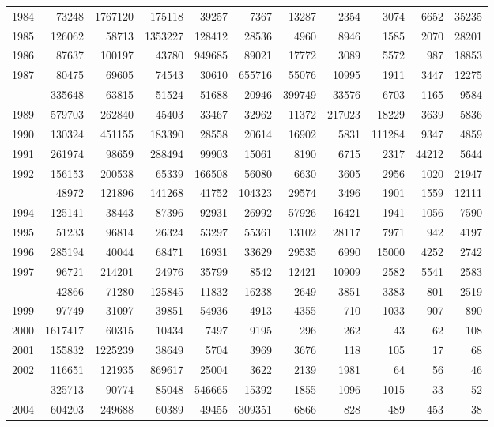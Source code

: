 \documentclass[
]{article}
\begin{document}
\begin{longtable}[t]{lrrrrrrrrrr}
1984 & 73248 & 1767120 & 175118 & 39257 & 7367 & 13287 & 2354 & 3074 & 6652 & 35235\\
1985 & 126062 & 58713 & 1353227 & 128412 & 28536 & 4960 & 8946 & 1585 & 2070 & 28201\\
1986 & 87637 & 100197 & 43780 & 949685 & 89021 & 17772 & 3089 & 5572 & 987 & 18853\\
1987 & 80475 & 69605 & 74543 & 30610 & 655716 & 55076 & 10995 & 1911 & 3447 & 12275\\
\addlinespace
1988 & 335648 & 63815 & 51524 & 51688 & 20946 & 399749 & 33576 & 6703 & 1165 & 9584\\
1989 & 579703 & 262840 & 45403 & 33467 & 32962 & 11372 & 217023 & 18229 & 3639 & 5836\\
1990 & 130324 & 451155 & 183390 & 28558 & 20614 & 16902 & 5831 & 111284 & 9347 & 4859\\
1991 & 261974 & 98659 & 288494 & 99903 & 15061 & 8190 & 6715 & 2317 & 44212 & 5644\\
1992 & 156153 & 200538 & 65339 & 166508 & 56080 & 6630 & 3605 & 2956 & 1020 & 21947\\
\addlinespace
1993 & 48972 & 121896 & 141268 & 41752 & 104323 & 29574 & 3496 & 1901 & 1559 & 12111\\
1994 & 125141 & 38443 & 87396 & 92931 & 26992 & 57926 & 16421 & 1941 & 1056 & 7590\\
1995 & 51233 & 96814 & 26324 & 53297 & 55361 & 13102 & 28117 & 7971 & 942 & 4197\\
1996 & 285194 & 40044 & 68471 & 16931 & 33629 & 29535 & 6990 & 15000 & 4252 & 2742\\
1997 & 96721 & 214201 & 24976 & 35799 & 8542 & 12421 & 10909 & 2582 & 5541 & 2583\\
\addlinespace
1998 & 42866 & 71280 & 125845 & 11832 & 16238 & 2649 & 3851 & 3383 & 801 & 2519\\
1999 & 97749 & 31097 & 39851 & 54936 & 4913 & 4355 & 710 & 1033 & 907 & 890\\
2000 & 1617417 & 60315 & 10434 & 7497 & 9195 & 296 & 262 & 43 & 62 & 108\\
2001 & 155832 & 1225239 & 38649 & 5704 & 3969 & 3676 & 118 & 105 & 17 & 68\\
2002 & 116651 & 121935 & 869617 & 25004 & 3622 & 2139 & 1981 & 64 & 56 & 46\\
\addlinespace
2003 & 325713 & 90774 & 85048 & 546665 & 15392 & 1855 & 1096 & 1015 & 33 & 52\\
2004 & 604203 & 249688 & 60389 & 49455 & 309351 & 6866 & 828 & 489 & 453 & 38\\

\end{longtable}
\end{document}
